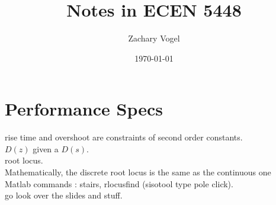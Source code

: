 \documentclass{article}
\author{Zachary Vogel}
\date{\today}
\title{Notes in ECEN 5448}
\begin{document}
\maketitle


\section*{Performance Specs}
rise time and overshoot are constraints of second order constants.\\

$D(z)$ given a $D(s)$.\\

root locus.\\
Mathematically, the discrete root locus is the same as the continuous one\\

Matlab commands : stairs, rlocusfind (sisotool type pole click).\\

go look over the slides and stuff.\\
\end{document}
